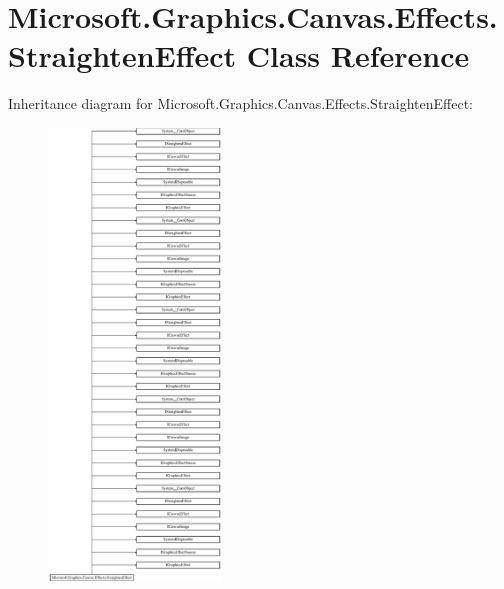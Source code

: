 \hypertarget{class_microsoft_1_1_graphics_1_1_canvas_1_1_effects_1_1_straighten_effect}{}\section{Microsoft.\+Graphics.\+Canvas.\+Effects.\+Straighten\+Effect Class Reference}
\label{class_microsoft_1_1_graphics_1_1_canvas_1_1_effects_1_1_straighten_effect}
Inheritance diagram for Microsoft.\+Graphics.\+Canvas.\+Effects.\+Straighten\+Effect\+:\begin{figure}[H]
\begin{center}
\leavevmode
\includegraphics[height=12.000000cm]{class_microsoft_1_1_graphics_1_1_canvas_1_1_effects_1_1_straighten_effect}
\end{center}
\end{figure}
